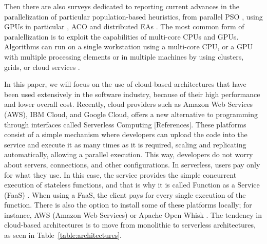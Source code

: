 \documentclass[runningheads]{llncs}
\begin{document}
Then there are also surveys dedicated to reporting current advances in the
parallelization of particular population-based heuristics, from parallel PSO
\cite{Lalwani2019}, using GPUs in particular \cite{tan2015survey}, ACO
\cite{pedemonte2011survey} and distributed EAs \cite{gong2015distributed}.  
The most common form of paralellization is to exploit the capabilities of
multi-core CPUs and GPUs. Algorithms can run on a single workstation using a
multi-core CPU, or a GPU with multiple processing elements or in multiple
machines by using clusters, grids, or cloud services \cite{Lalwani2019}.

In this paper, we will focus on the use of cloud-based architectures that have
been used extensively in the software industry, because of their high
performance and lower overall cost. Recently, cloud providers such as Amazon Web
Services (AWS), IBM Cloud, and Google Cloud, offers a new alternative to
programming through interfaces called Serverless Computing [References]. These
platforms consist of a simple mechanism where developers can upload the code
into the service and execute it as many times as it is required, scaling and
replicating automatically, allowing a parallel execution. This way, developers
do not worry about servers, connections, and other configurations. In
serverless, users pay only for what they use. In this case, the service provides
the simple concurrent execution of stateless functions, and that is why it is
called Function as a Service (FaaS) \cite{Hellerstein2018,Everywhere,Baird2016}
. When using a FaaS, the client pays for every single execution of the function.
There is also the option to install some of these platforms locally; for
instance, AWS (Amazon Web Services) \cite{Baird2016} or Apache Open Whisk
\cite{Guerv2018}. The tendency in cloud-based architectures is to move from 
monolithic to serverless architectures, as seen in Table~\ref{table:architectures}.     
\end{document}
